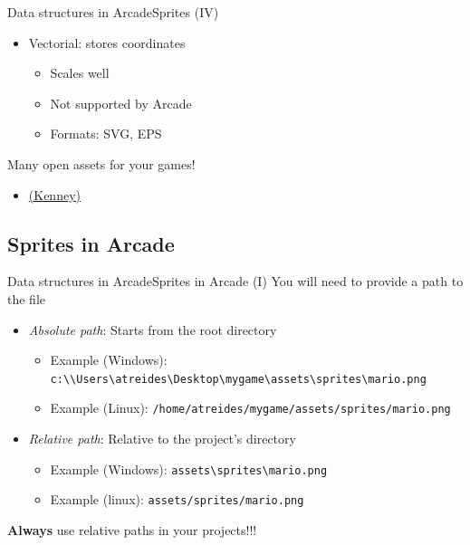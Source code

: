 \documentclass[10pt,compress]{beamer} %
\begin{document}
{\begin{frame}{Data structures in Arcade}{Sprites (IV)}
\begin{itemize}
            \item Vectorial: stores coordinates
                \begin{itemize}
                \item Scales well
                \item Not supported by Arcade
                \item Formats: SVG, EPS
                \end{itemize}
	    \end{itemize}

    Many open assets for your games!
        \begin{itemize}
        \item \href{https://kenney.nl/assets}{(Kenney)}
        \end{itemize}
\end{frame}

\subsection{Sprites in Arcade}

\begin{frame}{Data structures in Arcade}{Sprites in Arcade (I)}
    You will need to provide a \alert{path} to the file
    \begin{itemize}
        \item \textit{Absolute path}: Starts from the root directory
            \begin{itemize}
            \item Example (Windows): \texttt{c:\textbackslash\textbackslash Users\textbackslash atreides\textbackslash Desktop\textbackslash mygame\textbackslash assets\textbackslash sprites\textbackslash mario.png}
            \item Example (Linux): \texttt{/home/atreides/mygame/assets/sprites/mario.png}
            \end{itemize}
        \item \textit{Relative path}: Relative to the project's directory
            \begin{itemize}
            \item Example (Windows): \texttt{assets\textbackslash sprites\textbackslash mario.png}
            \item Example (linux): \texttt{assets/sprites/mario.png}
            \end{itemize}
    \end{itemize}

    \textbf{Always} use relative paths in your projects!!!
\end{frame}

}
\end{document}
